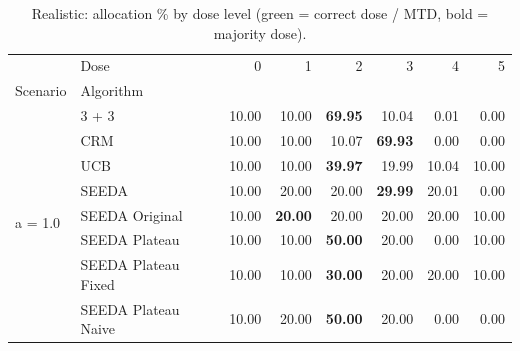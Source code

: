 \begin{table}[H]
\centering
\caption{Realistic: allocation \% by dose level (green = correct dose / MTD, bold = majority dose).}
\label{tab:real_alloc_by_dose}
\begin{tabular}{llrrrrrr}
\toprule
 & Dose & 0 & 1 & 2 & 3 & 4 & 5 \\
Scenario & Algorithm &  &  &  &  &  &  \\
\midrule
\multirow[c]{8}{*}{a = 1.0} & 3 + 3 & 10.00 & 10.00 & {\cellcolor[HTML]{C8E6C9}} \bfseries 69.95 & 10.04 & 0.01 & 0.00 \\
 & CRM & 10.00 & 10.00 & {\cellcolor[HTML]{C8E6C9}} 10.07 & \bfseries 69.93 & 0.00 & 0.00 \\
 & UCB & 10.00 & 10.00 & {\cellcolor[HTML]{C8E6C9}} \bfseries 39.97 & 19.99 & 10.04 & 10.00 \\
 & SEEDA & 10.00 & 20.00 & {\cellcolor[HTML]{C8E6C9}} 20.00 & \bfseries 29.99 & 20.01 & 0.00 \\
 & SEEDA Original & 10.00 & \bfseries 20.00 & {\cellcolor[HTML]{C8E6C9}} 20.00 & 20.00 & 20.00 & 10.00 \\
 & SEEDA Plateau & 10.00 & 10.00 & {\cellcolor[HTML]{C8E6C9}} \bfseries 50.00 & 20.00 & 0.00 & 10.00 \\
 & SEEDA Plateau Fixed & 10.00 & 10.00 & {\cellcolor[HTML]{C8E6C9}} \bfseries 30.00 & 20.00 & 20.00 & 10.00 \\
 & SEEDA Plateau Naive & 10.00 & 20.00 & {\cellcolor[HTML]{C8E6C9}} \bfseries 50.00 & 20.00 & 0.00 & 0.00 \\
\bottomrule
\end{tabular}
\end{table}
